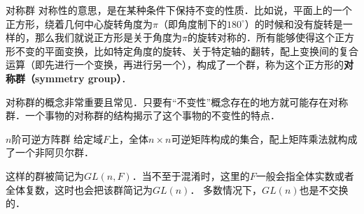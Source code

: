 \begin{example}{对称群}\label{Group_ex4}
对称性的意思，是在某种条件下保持不变的性质．比如说，平面上的一个正方形，绕着几何中心旋转角度为$\pi$（即角度制下的$180^\circ$）的时候和没有旋转是一样的，那么我们就说正方形是关于角度为$\pi$的旋转对称的．所有能够使得这个正方形不变的平面变换，比如特定角度的旋转、关于特定轴的翻转，配上变换间的复合运算（即先进行一个变换，再进行另一个），构成了一个群，称为这个正方形的\textbf{对称群（symmetry group）}．
\end{example}
对称群的概念非常重要且常见．只要有“不变性”概念存在的地方就可能存在对称群．一个事物的对称群的结构揭示了这个事物的不变性的特点．
\begin{example}{$n$阶可逆方阵群}\label{Group_ex5}
给定域$F$上，全体$n\times n$可逆矩阵构成的集合，配上矩阵乘法就构成了一个非阿贝尔群．%

这样的群被简记为$GL(n, F)$．当不至于混淆时，这里的$F$一般会指全体实数或者全体复数，这时也会把该群简记为$GL(n)$． 多数情况下，$GL(n)$也是不交换的．

\end{example}

